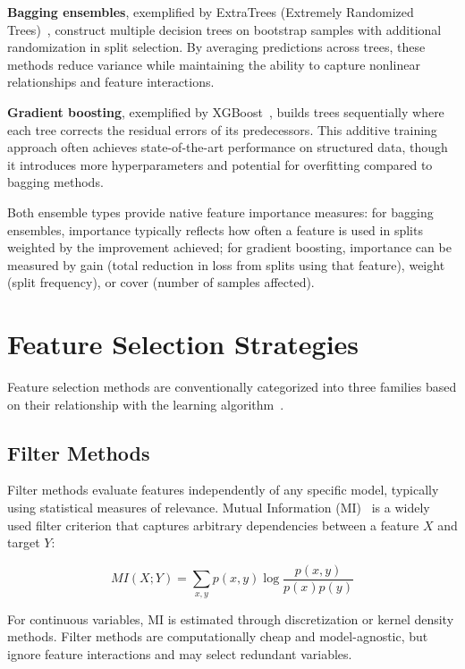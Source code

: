 \textbf{Bagging ensembles}, exemplified by ExtraTrees (Extremely Randomized Trees)~\cite{geurts2006extremely}, construct multiple decision trees on bootstrap samples with additional randomization in split selection. By averaging predictions across trees, these methods reduce variance while maintaining the ability to capture nonlinear relationships and feature interactions.

\textbf{Gradient boosting}, exemplified by XGBoost~\cite{chen2016xgboost}, builds trees sequentially where each tree corrects the residual errors of its predecessors. This additive training approach often achieves state-of-the-art performance on structured data, though it introduces more hyperparameters and potential for overfitting compared to bagging methods.

Both ensemble types provide native feature importance measures: for bagging ensembles, importance typically reflects how often a feature is used in splits weighted by the improvement achieved; for gradient boosting, importance can be measured by gain (total reduction in loss from splits using that feature), weight (split frequency), or cover (number of samples affected).

\section{Feature Selection Strategies}

Feature selection methods are conventionally categorized into three families based on their relationship with the learning algorithm~\cite{guyon2003introduction}.

\subsection{Filter Methods}

Filter methods evaluate features independently of any specific model, typically using statistical measures of relevance. Mutual Information (MI)~\cite{Cover2006Elements} is a widely used filter criterion that captures arbitrary dependencies between a feature $X$ and target $Y$:

\begin{equation}
MI(X; Y) = \sum_{x,y} p(x,y) \log \frac{p(x,y)}{p(x)p(y)}
\end{equation}

For continuous variables, MI is estimated through discretization or kernel density methods. Filter methods are computationally cheap and model-agnostic, but ignore feature interactions and may select redundant variables.

